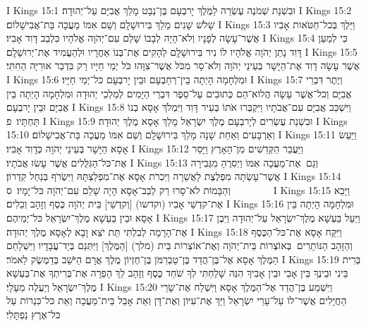 I Kings 15:1	וּבִשְׁנַת שְׁמֹנֶה עֶשְׂרֵה לַמֶּלֶךְ יָרבְעָם בֶּן־נְבָט מָלַךְ אֲבִיָּם עַל־יְהוּדָה׃
I Kings 15:2	שָׁלֹשׁ שָׁנִים מָלַךְ בִּירוּשָׁלָ͏ִם וְשֵׁם אִמּוֹ מַעֲכָה בַּת־אֲבִישָׁלוֹם׃
I Kings 15:3	וַיֵּלֶךְ בְּכל־חַטֹּאות אָבִיו אֲשֶׁר־עָשָׂה לְפָנָיו וְלֹא־הָיָה לְבָבוֹ שָׁלֵם עִם־יְהֹוָה אֱלֹהָיו כִּלְבַב דָּוִד אָבִיו׃
I Kings 15:4	כִּי לְמַעַן דָּוִד נָתַן יְהֹוָה אֱלֹהָיו לוֹ נִיר בִּירוּשָׁלָ͏ִם לְהָקִים אֶת־בְּנוֹ אַחֲרָיו וּלְהַעֲמִיד אֶת־יְרוּשָׁלָ͏ִם׃
I Kings 15:5	אֲשֶׁר עָשָׂה דָוִד אֶת־הַיָּשָׁר בְּעֵינֵי יְהֹוָה וְלֹא־סָר מִכֹּל אֲשֶׁר־צִוָּהוּ כֹּל יְמֵי חַיָּיו רַק בִּדְבַר אוּרִיָּה הַחִתִּי׃
I Kings 15:6	וּמִלְחָמָה הָיְתָה בֵין־רְחַבְעָם וּבֵין יָרבְעָם כּל־יְמֵי חַיָּיו׃
I Kings 15:7	וְיֶתֶר דִּבְרֵי אֲבִיָּם וְכל־אֲשֶׁר עָשָׂה הֲלוֹא־הֵם כְּתוּבִים עַל־סֵפֶר דִּבְרֵי הַיָּמִים לְמַלְכֵי יְהוּדָה וּמִלְחָמָה הָיְתָה בֵּין אֲבִיָּם וּבֵין יָרבְעָם׃
I Kings 15:8	וַיִּשְׁכַּב אֲבִיָּם עִם־אֲבֹתָיו וַיִּקְבְּרוּ אֹתוֹ בְּעִיר דָּוִד וַיִּמְלֹךְ אָסָא בְנוֹ תַּחְתָּיו׃ {פ}
I Kings 15:9	וּבִשְׁנַת עֶשְׂרִים לְיָרבְעָם מֶלֶךְ יִשְׂרָאֵל מָלַךְ אָסָא מֶלֶךְ יְהוּדָה׃
I Kings 15:10	וְאַרְבָּעִים וְאַחַת שָׁנָה מָלַךְ בִּירוּשָׁלָ͏ִם וְשֵׁם אִמּוֹ מַעֲכָה בַּת־אֲבִישָׁלוֹם׃
I Kings 15:11	וַיַּעַשׂ אָסָא הַיָּשָׁר בְּעֵינֵי יְהֹוָה כְּדָוִד אָבִיו׃
I Kings 15:12	וַיַּעֲבֵר הַקְּדֵשִׁים מִן־הָאָרֶץ וַיָּסַר אֶת־כּל־הַגִּלֻּלִים אֲשֶׁר עָשׂוּ אֲבֹתָיו׃
I Kings 15:13	וְגַם  אֶת־מַעֲכָה אִמּוֹ וַיְסִרֶהָ מִגְּבִירָה אֲשֶׁר־עָשְׂתָה מִפְלֶצֶת לָאֲשֵׁרָה וַיִּכְרֹת אָסָא אֶת־מִפְלַצְתָּהּ וַיִּשְׂרֹף בְּנַחַל קִדְרוֹן׃
I Kings 15:14	וְהַבָּמוֹת לֹא־סָרוּ רַק לְבַב־אָסָא הָיָה שָׁלֵם עִם־יְהֹוָה כּל־יָמָיו׃ {ס}        
I Kings 15:15	וַיָּבֵא אֶת־קדְשֵׁי אָבִיו (וקדשו) [וְקדְשֵׁי] בֵּית יְהֹוָה כֶּסֶף וְזָהָב וְכֵלִים׃
I Kings 15:16	וּמִלְחָמָה הָיְתָה בֵּין אָסָא וּבֵין בַּעְשָׁא מֶלֶךְ־יִשְׂרָאֵל כּל־יְמֵיהֶם׃
I Kings 15:17	וַיַּעַל בַּעְשָׁא מֶלֶךְ־יִשְׂרָאֵל עַל־יְהוּדָה וַיִּבֶן אֶת־הָרָמָה לְבִלְתִּי תֵּת יֹצֵא וָבָא לְאָסָא מֶלֶךְ יְהוּדָה׃
I Kings 15:18	וַיִּקַּח אָסָא אֶת־כּל־הַכֶּסֶף וְהַזָּהָב הַנּוֹתָרִים  בְּאוֹצְרוֹת בֵּית־יְהֹוָה וְאֶת־אוֹצְרוֹת בֵּית (מלך) [הַמֶּלֶךְ] וַיִּתְּנֵם בְּיַד־עֲבָדָיו וַיִּשְׁלָחֵם הַמֶּלֶךְ אָסָא אֶל־בֶּן־הֲדַד בֶּן־טַבְרִמֹּן בֶּן־חֶזְיוֹן מֶלֶךְ אֲרָם הַיֹּשֵׁב בְּדַמֶּשֶׂק לֵאמֹר׃
I Kings 15:19	בְּרִית בֵּינִי וּבֵינֶךָ בֵּין אָבִי וּבֵין אָבִיךָ הִנֵּה שָׁלַחְתִּי לְךָ שֹׁחַד כֶּסֶף וְזָהָב לֵךְ הָפֵרָה אֶת־בְּרִיתְךָ אֶת־בַּעְשָׁא מֶלֶךְ־יִשְׂרָאֵל וְיַעֲלֶה מֵעָלָי׃
I Kings 15:20	וַיִּשְׁמַע בֶּן־הֲדַד אֶל־הַמֶּלֶךְ אָסָא וַיִּשְׁלַח אֶת־שָׂרֵי הַחֲיָלִים אֲשֶׁר־לוֹ עַל־עָרֵי יִשְׂרָאֵל וַיַּךְ אֶת־עִיּוֹן וְאֶת־דָּן וְאֵת אָבֵל בֵּית־מַעֲכָה וְאֵת כּל־כִּנְרוֹת עַל כּל־אֶרֶץ נַפְתָּלִי׃
